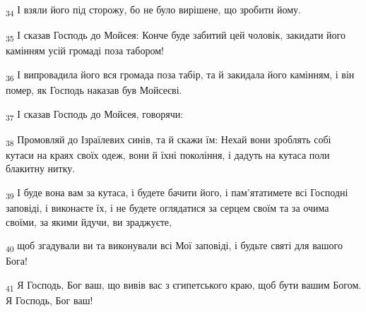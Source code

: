 \begin{tcolorbox}
\textsubscript{34} І взяли його під сторожу, бо не було вирішене, що зробити йому.
\end{tcolorbox}
\begin{tcolorbox}
\textsubscript{35} І сказав Господь до Мойсея: Конче буде забитий цей чоловік, закидати його камінням усій громаді поза табором!
\end{tcolorbox}
\begin{tcolorbox}
\textsubscript{36} І випровадила його вся громада поза табір, та й закидала його камінням, і він помер, як Господь наказав був Мойсеєві.
\end{tcolorbox}
\begin{tcolorbox}
\textsubscript{37} І сказав Господь до Мойсея, говорячи:
\end{tcolorbox}
\begin{tcolorbox}
\textsubscript{38} Промовляй до Ізраїлевих синів, та й скажи їм: Нехай вони зроблять собі кутаси на краях своїх одеж, вони й їхні покоління, і дадуть на кутаса поли блакитну нитку.
\end{tcolorbox}
\begin{tcolorbox}
\textsubscript{39} І буде вона вам за кутаса, і будете бачити його, і пам'ятатимете всі Господні заповіді, і виконаєте їх, і не будете оглядатися за серцем своїм та за очима своїми, за якими йдучи, ви зраджуєте,
\end{tcolorbox}
\begin{tcolorbox}
\textsubscript{40} щоб згадували ви та виконували всі Мої заповіді, і будьте святі для вашого Бога!
\end{tcolorbox}
\begin{tcolorbox}
\textsubscript{41} Я Господь, Бог ваш, що вивів вас з єгипетського краю, щоб бути вашим Богом. Я Господь, Бог ваш!
\end{tcolorbox}
